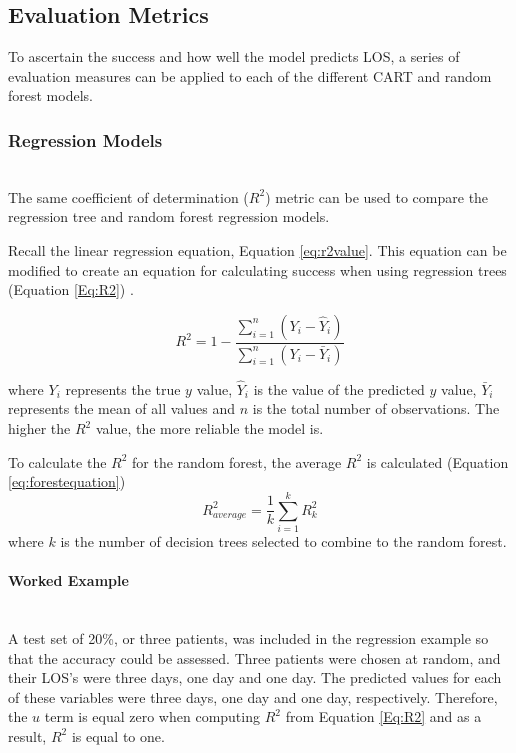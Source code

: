 \documentclass[../thesis.tex]{subfiles}
\begin{document}
\subsection{Evaluation Metrics}
To ascertain the success and how well the model predicts LOS, a series of evaluation measures can be applied to each of the different CART and random forest models.

\subsubsection{Regression Models}\\
The same coefficient of determination ($R^2$) metric can be used to compare the regression tree and random forest regression models. 

Recall the linear regression equation, Equation \eqref{eq:r2value}. This equation can be modified to create an equation for calculating success when using regression trees (Equation \eqref{Eq:R2}) \cite{Chicco2021}.

\begin{equation}\label{Eq:R2}
    R^{2} = 1 - \frac{\sum^n_{i=1} (Y_{i}- \hat{Y}_{i})}{\sum^{n}_{i=1} (Y_{i} -\bar{Y}_{i})}
\end{equation}

where $Y_{i}$ represents the true $y$ value, $\hat {Y}_i$ is the value of the predicted $y$ value, $\bar Y_{i}$ represents the mean of all values and $n$ is the total number of observations. The higher the $R^{2}$ value, the more reliable the model is.

To calculate the $R^{2}$ for the random forest, the average $R^{2}$ is calculated (Equation \eqref{eq:forestequation}) 
\begin{equation}\label{eq:forestequation}
    R^{2}_{average} = \frac{1}{k}\sum_{i=1}^{k}R^{2}_{k}
\end{equation}
where $k$ is the number of decision trees selected to combine to the random forest.

\paragraph{Worked Example}\\
A test set of 20\%, or three patients, was included in the regression example so that the accuracy could be assessed. Three patients were chosen at random, and their LOS's were three days, one day and one day. The predicted values for each of these variables were three days, one day and one day, respectively. Therefore, the $u$ term is equal zero when computing $R^{2}$ from Equation \eqref{Eq:R2} and as a result, $R^{2}$ is equal to one.
\end{document}
